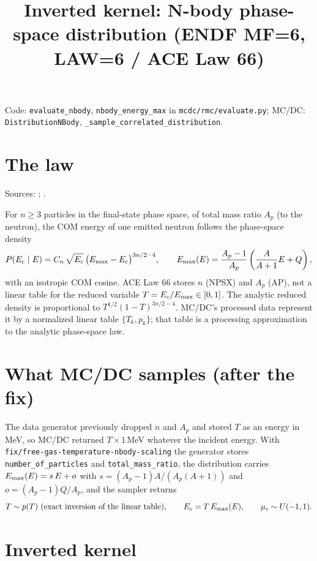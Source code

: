 \documentclass[11pt]{article}
\title{Inverted kernel: N-body phase-space distribution (ENDF MF=6, LAW=6 / ACE Law 66)}
\date{}
\begin{document}
\maketitle

\noindent Code: \texttt{evaluate\_nbody}, \texttt{nbody\_energy\_max} in
\texttt{mcdc/rmc/evaluate.py}; MC/DC: \texttt{DistributionNBody},
\texttt{\_sample\_correlated\_distribution}.

\section{The law}

\noindent Sources: ; .

For $n\ge3$ particles in the final-state phase space, of total mass ratio $A_p$
(to the neutron), the COM energy
of one emitted neutron follows the phase-space density
\begin{equation}
  P(E_{c} \mid E) = C_n\,\sqrt{E_{c}}\,\big(E_{\max} - E_{c}\big)^{3n/2 - 4},\qquad
  E_{\max}(E) = \frac{A_p - 1}{A_p}\left(\frac{A}{A+1}E + Q\right),
\end{equation}
with an isotropic COM cosine. ACE Law 66 stores $n$ (NPSX) and $A_p$ (AP), not a
linear table for the reduced variable $T=E_{c}/E_{\max}\in[0,1]$.
The analytic reduced density is proportional to
$T^{1/2}(1-T)^{3n/2-4}$. MC/DC's processed data represent it by a normalized
linear table $\{T_k,p_k\}$; that table is a processing approximation to the
analytic phase-space law.

\section{What MC/DC samples (after the fix)}

The data generator previously dropped $n$ and $A_p$ and stored $T$ as an energy in MeV,
so MC/DC returned $T\times 1$\,MeV whatever the incident energy. With
\texttt{fix/free-gas-temperature-nbody-scaling} the generator stores
\texttt{number\_of\_particles} and \texttt{total\_mass\_ratio}, the distribution
carries $E_{\max}(E) = s\,E + o$ with $s = (A_p - 1)A/(A_p(A+1))$ and
$o = (A_p - 1)Q/A_p$, and the sampler returns
\begin{equation}
  T \sim p(T)\ \text{(exact inversion of the linear table)},\qquad
  \Ecm = T\,E_{\max}(\Ein),\qquad \mucm \sim U(-1, 1).
\end{equation}

\section{Inverted kernel}
\end{document}
